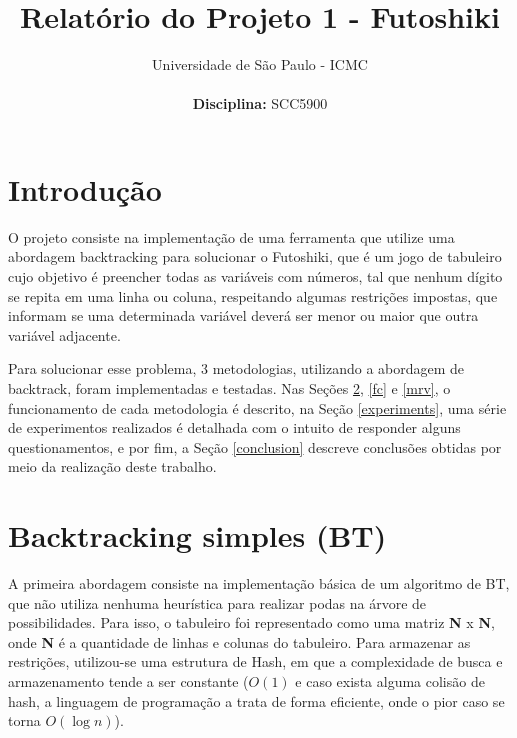 \documentclass[9pt,technote,compsoc]{IEEEtran}
\makeatletter
\renewcommand{\maketitle}{
\begin{flushleft}
  \LARGE{\textbf{\@title}}
  \normalsize{{\@author}}
\end{flushleft}
}
\makeatother
\begin{document}
\title{Relatório do Projeto 1 - Futoshiki}

\author{
Universidade de São Paulo - ICMC\\
\small{\\
\textbf{Disciplina:} SCC5900}}

\maketitle

\IEEEpeerreviewmaketitle


\section{Introdução}
O projeto consiste na implementação de uma ferramenta que utilize uma abordagem backtracking para solucionar o Futoshiki, que é um jogo de tabuleiro cujo objetivo é preencher todas as variáveis com números, tal que nenhum dígito se repita em uma linha ou coluna, respeitando algumas restrições impostas, que informam se uma determinada variável deverá ser menor ou maior que outra variável adjacente.

Para solucionar esse problema, 3 metodologias, utilizando a abordagem de backtrack, foram implementadas e testadas. Nas Seções \ref{bt}, \ref{fc} e \ref{mrv}, o funcionamento de cada metodologia é descrito, na Seção \ref{experiments}, uma série de experimentos realizados é detalhada com o intuito de responder alguns questionamentos, e por fim, a Seção \ref{conclusion} descreve conclusões obtidas por meio da realização deste trabalho.


\section{Backtracking simples (BT)}\label{bt}
A primeira abordagem consiste na implementação básica de um algoritmo de BT, que não utiliza nenhuma heurística para realizar podas na árvore de possibilidades. Para isso, o tabuleiro foi representado como uma matriz \textbf{N} x \textbf{N}, onde \textbf{N} é a quantidade de linhas e colunas do tabuleiro. Para armazenar as restrições, utilizou-se uma estrutura de Hash, em que a complexidade de busca e armazenamento tende a ser constante ($O(1)$ e caso exista alguma colisão de hash, a linguagem de programação a trata de forma eficiente, onde o pior caso se torna $O(\log n)$).
\end{document}
